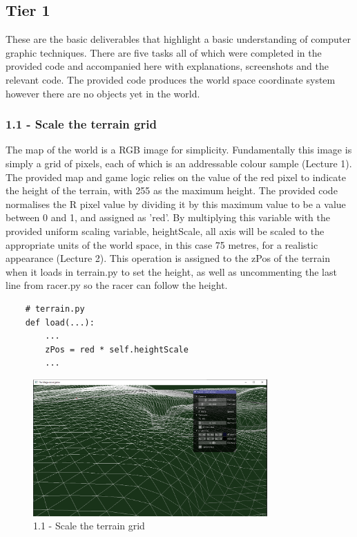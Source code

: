 \documentclass[a4 paper, 12pt]{article}
\begin{document}
\subsection{Tier 1}
These are the basic deliverables that highlight a basic understanding of computer graphic techniques. There are five tasks all of which were completed in the provided code and accompanied here with explanations, screenshots and the relevant code. The provided code produces the world space coordinate system however there are no objects yet in the world.

\subsubsection{1.1 - Scale the terrain grid}
The map of the world is a RGB image for simplicity. Fundamentally this image is simply a grid of pixels, each of which is an addressable colour sample (Lecture 1). The provided map and game logic relies on the value of the red pixel to indicate the height of the terrain, with 255 as the maximum height. The provided code normalises the R pixel value by dividing it by this maximum value to be a value between 0 and 1, and assigned as 'red'. By multiplying this variable with the provided uniform scaling variable, heightScale, all axis will be scaled to the appropriate units of the world space, in this case 75 metres, for a realistic appearance (Lecture 2). This operation is assigned to the zPos of the terrain when it loads in terrain.py to set the height, as well as uncommenting the last line from racer.py so the racer can follow the height.   
    \begin{lstlisting}
    # terrain.py
    def load(...):
        ...
        zPos = red * self.heightScale
        ...
    \end{lstlisting}

    \begin{figure} [H]
        \centering
        \includegraphics[width=0.8\textwidth, frame]
            {./images/mega_racer/1.1.PNG}
        \caption{1.1 - Scale the terrain grid}
    \end{figure}  
   
\end{document}
